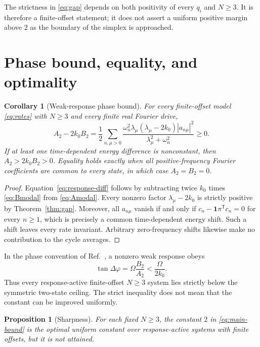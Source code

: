 \documentclass[11pt]{article}
\newtheorem{proposition}[theorem]{Proposition}
\newtheorem{corollary}[theorem]{Corollary}
\newcommand{\one}{\bm{1}}
\begin{document}
The strictness in \eqref{eq:gap} depends on both positivity of every $q_i$ and
$N\geq3$.  It is therefore a finite-offset statement; it does not assert a uniform
positive margin above $2$ as the boundary of the simplex is approached.

\section{Phase bound, equality, and optimality}             \label{sec:phase}

\begin{corollary}[Weak-response phase bound]
For every finite-offset model \eqref{eq:rates} with $N\geq3$ and every finite real
Fourier drive,
\begin{equation}
 A_2-2k_0B_2
 =\frac12\sum_{n,\mu>0}
 \frac{\omega_n^2\lambda_\mu(\lambda_\mu-2k_0)
       |a_{n\mu}|^2}{\lambda_\mu^2+\omega_n^2}\geq0.        \label{eq:response-diff}
\end{equation}
If at least one time-dependent energy difference is nonconstant, then
$A_2>2k_0B_2>0$.  Equality holds exactly when all positive-frequency Fourier
coefficients are common to every state, in which case $A_2=B_2=0$.
\end{corollary}

\begin{proof}
Equation~\eqref{eq:response-diff} follows by subtracting twice $k_0$ times
\eqref{eq:Bmodal} from \eqref{eq:Amodal}.  Every nonzero factor
$\lambda_\mu-2k_0$ is strictly positive by Theorem~\ref{thm:gap}.  Moreover, all
$a_{n\mu}$ vanish if and only if
$c_n-\one\pi^{\mathsf T}c_n=0$ for every $n\geq1$, which is precisely a common
time-dependent energy shift.  Such a shift leaves every rate invariant.  Arbitrary
zero-frequency shifts likewise make no contribution to the cycle averages.
\end{proof}

In the phase convention of Ref.~\cite{Deguenther2022}, a nonzero weak response obeys
\begin{equation}
 \tan\Delta\varphi=\Omega\frac{B_2}{A_2}
 <\frac{\Omega}{2k_0}.                                      \label{eq:phase}
\end{equation}
Thus every response-active finite-offset $N\geq3$ system lies strictly below the
symmetric two-state ceiling.  The strict inequality does not mean that the constant
can be improved uniformly.

\begin{proposition}[Sharpness]
For each fixed $N\geq3$, the constant $2$ in \eqref{eq:main-bound} is the optimal
uniform constant over response-active systems with finite offsets, but it is not
attained.
\end{proposition}
\end{document}

